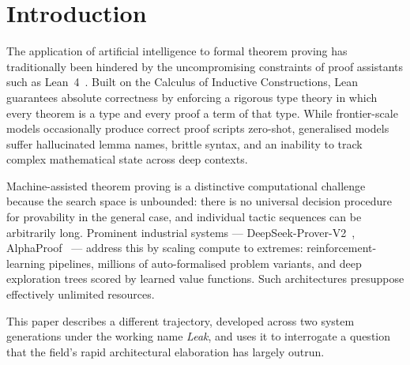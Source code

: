 \documentclass[12pt, a4paper]{article}
\begin{document}
\begin{abstract}
We therefore resist the conclusion that strategy is uniformly beneficial. The
evidence supports a weaker and more specific claim: scaffolding that
tightens the feedback loop or bounds context reliably helps, whereas
scaffolding that adds coordination structure without adding information can
degrade performance relative to a competent flat baseline. We further argue
that all such measurements, including ours, are currently confounded by data
contamination of a kind that release-date arguments cannot dispel, since
FATE-X is explicitly assembled from textbooks, qualifying examinations and
research literature, and we propose a difficulty-matched statistical control
as partial mitigation.
\end{abstract}

\newpage
\tableofcontents
\newpage

\section{Introduction}

The application of artificial intelligence to formal theorem proving has
traditionally been hindered by the uncompromising constraints of proof
assistants such as Lean~4~\cite{demoura2021lean4}. Built on the Calculus of
Inductive Constructions,
Lean guarantees absolute correctness by enforcing a rigorous type theory in
which every theorem is a type and every proof a term of that type. While
frontier-scale models occasionally produce correct proof scripts zero-shot,
generalised models suffer hallucinated lemma names, brittle syntax, and an
inability to track complex mathematical state across deep contexts.

Machine-assisted theorem proving is a distinctive computational challenge
because the search space is unbounded: there is no universal decision
procedure for provability in the general case, and individual tactic
sequences can be arbitrarily long. Prominent industrial systems ---
DeepSeek-Prover-V2~\cite{deepseekproverv2},
AlphaProof~\cite{alphaproof2024} --- address this by scaling compute to
extremes: reinforcement-learning pipelines, millions of auto-formalised
problem variants, and deep exploration trees scored by learned value
functions. Such architectures presuppose effectively unlimited resources.

This paper describes a different trajectory, developed across two system
generations under the working name \emph{Leak}, and uses it to interrogate a
question that the field's rapid architectural elaboration has largely
outrun.
\end{document}
